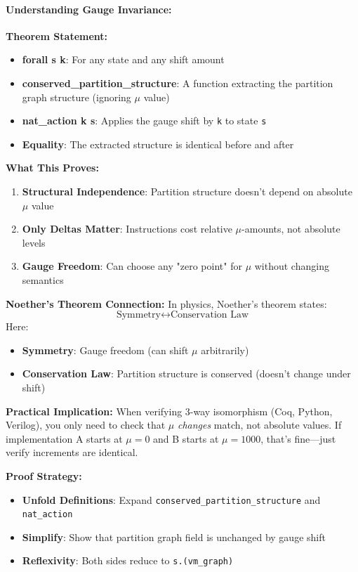 \paragraph{Understanding Gauge Invariance:}
\textbf{Theorem Statement:}
\begin{itemize}
    \item \textbf{forall s k}: For any state and any shift amount
    \item \textbf{conserved\_partition\_structure}: A function extracting the partition graph structure (ignoring $\mu$ value)
    \item \textbf{nat\_action k s}: Applies the gauge shift by \texttt{k} to state \texttt{s}
    \item \textbf{Equality}: The extracted structure is identical before and after
\end{itemize}

\textbf{What This Proves:}
\begin{enumerate}
    \item \textbf{Structural Independence}: Partition structure doesn't depend on absolute $\mu$ value
    \item \textbf{Only Deltas Matter}: Instructions cost relative $\mu$-amounts, not absolute levels
    \item \textbf{Gauge Freedom}: Can choose any "zero point" for $\mu$ without changing semantics
\end{enumerate}

\textbf{Noether's Theorem Connection:} In physics, Noether's theorem states:
\[
\text{Symmetry} \leftrightarrow \text{Conservation Law}
\]
Here:
\begin{itemize}
    \item \textbf{Symmetry}: Gauge freedom (can shift $\mu$ arbitrarily)
    \item \textbf{Conservation Law}: Partition structure is conserved (doesn't change under shift)
\end{itemize}

\textbf{Practical Implication:} When verifying 3-way isomorphism (Coq, Python, Verilog), you only need to check that $\mu$ \emph{changes} match, not absolute values. If implementation A starts at $\mu=0$ and B starts at $\mu=1000$, that's fine—just verify increments are identical.

\textbf{Proof Strategy:}
\begin{itemize}
    \item \textbf{Unfold Definitions}: Expand \texttt{conserved\_partition\_structure} and \texttt{nat\_action}
    \item \textbf{Simplify}: Show that partition graph field is unchanged by gauge shift
    \item \textbf{Reflexivity}: Both sides reduce to \texttt{s.(vm\_graph)}
\end{itemize}

